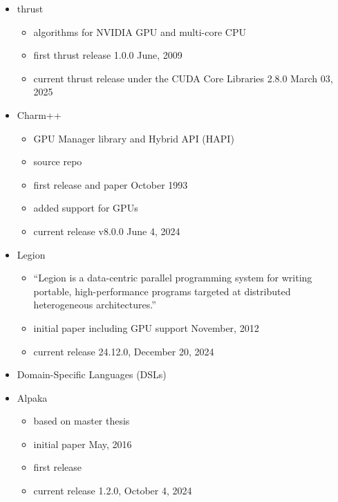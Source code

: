 \begin{itemize}
    \item thrust
    \begin{itemize}
        \item algorithms for NVIDIA GPU and multi-core CPU~\cite{bell_thrust_2012}
        \item first thrust release 1.0.0 June, 2009~\cite{nvidia_corporation_thrust_2009}
        \item current thrust release under the CUDA \cpp Core Libraries 2.8.0 March 03, 2025~\cite{cccl_development_team_release_2023}
    \end{itemize}

    \item Charm++
    \begin{itemize}
        \item GPU Manager library and Hybrid API (HAPI)
        \item source repo~\cite{kale_uiuc-pplcharm_2021}
        \item first release and paper October 1993~\cite{kale_charm_1993}
        \item added support for GPUs~\cite{wesolowski_application_2008}
        \item current release v8.0.0 June 4, 2024~\cite{noauthor_release_2024}
    \end{itemize}

    \item Legion
    \begin{itemize}
        \item \enquote{Legion is a data-centric parallel programming system for writing portable, high-performance programs targeted at distributed heterogeneous architectures.}
        \item initial paper including GPU support November, 2012~\cite{bauer_legion_2012}
        \item current release 24.12.0, December 20, 2024~\cite{stanford_release_2024}
    \end{itemize}

    \item Domain-Specific Languages (DSLs)

    \item Alpaka
    \begin{itemize}
        \item based on master thesis~\cite{worpitz_investigating_2015}
        \item initial paper May, 2016~\cite{zenker_alpaka_2016}
        \item first release~\cite{alpaka-group_release_2016}
        \item current release 1.2.0, October 4, 2024~\cite{alpaka-group_release_2024}
    \end{itemize}
\end{itemize}